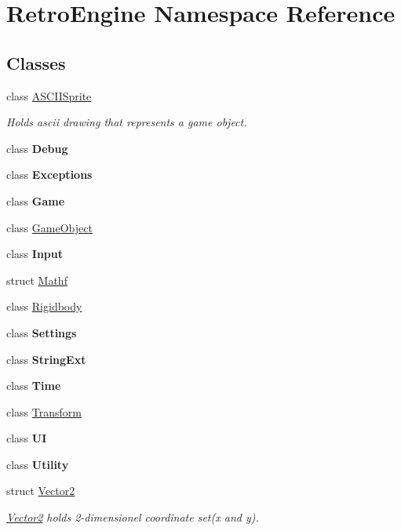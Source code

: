 \hypertarget{namespace_retro_engine}{}\section{Retro\+Engine Namespace Reference}
\label{namespace_retro_engine}
\subsection*{Classes}
\begin{DoxyCompactItemize}
\item 
class \mbox{\hyperlink{class_retro_engine_1_1_a_s_c_i_i_sprite}{A\+S\+C\+I\+I\+Sprite}}
\begin{DoxyCompactList}\small\item\em Holds ascii drawing that represents a game object. \end{DoxyCompactList}\item 
class {\bfseries Debug}
\item 
class {\bfseries Exceptions}
\item 
class {\bfseries Game}
\item 
class \mbox{\hyperlink{class_retro_engine_1_1_game_object}{Game\+Object}}
\item 
class {\bfseries Input}
\item 
struct \mbox{\hyperlink{struct_retro_engine_1_1_mathf}{Mathf}}
\item 
class \mbox{\hyperlink{class_retro_engine_1_1_rigidbody}{Rigidbody}}
\item 
class {\bfseries Settings}
\item 
class {\bfseries String\+Ext}
\item 
class {\bfseries Time}
\item 
class \mbox{\hyperlink{class_retro_engine_1_1_transform}{Transform}}
\item 
class {\bfseries UI}
\item 
class {\bfseries Utility}
\item 
struct \mbox{\hyperlink{struct_retro_engine_1_1_vector2}{Vector2}}
\begin{DoxyCompactList}\small\item\em \mbox{\hyperlink{struct_retro_engine_1_1_vector2}{Vector2}} holds 2-\/dimensionel coordinate set(x and y). \end{DoxyCompactList}\end{DoxyCompactItemize}
